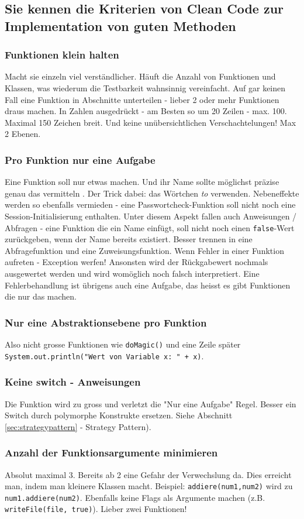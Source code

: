 \subsection{Sie kennen die Kriterien von Clean Code zur Implementation von guten Methoden}
\subsubsection{Funktionen klein halten}
Macht sie einzeln viel verständlicher. Häuft die Anzahl von Funktionen und Klassen, was wiederum die Testbarkeit wahnsinnig vereinfacht. Auf gar keinen Fall eine Funktion in Abschnitte unterteilen - lieber 2 oder mehr Funktionen draus machen.
In Zahlen ausgedrückt - am Besten so um 20 Zeilen - max. 100. Maximal 150 Zeichen breit. Und keine unübersichtlichen Verschachtelungen! Max 2 Ebenen.
\subsubsection{Pro Funktion nur eine Aufgabe}
Eine Funktion soll nur etwas machen.  Und ihr Name sollte möglichst präzise genau das vermitteln . Der Trick dabei: das Wörtchen \emph{to} verwenden.  
Nebeneffekte werden so ebenfalls vermieden - eine Passwortcheck-Funktion soll nicht noch eine Session-Initialisierung enthalten. 
Unter diesem Aspekt fallen auch Anweisungen / Abfragen - eine Funktion die ein Name einfügt, soll nicht noch einen \texttt{false}-Wert zurückgeben, wenn der Name bereits existiert. Besser trennen in eine Abfragefunktion und eine Zuweisungsfunktion. 
Wenn Fehler in einer Funktion aufreten - Exception werfen! Ansonsten wird der Rückgabewert nochmals ausgewertet werden und wird womöglich noch falsch interpretiert.
Eine Fehlerbehandlung ist übrigens auch eine Aufgabe, das heisst es gibt Funktionen die nur das machen.
\subsubsection{Nur eine Abstraktionsebene pro Funktion}
Also nicht grosse Funktionen wie \texttt{doMagic()} und eine Zeile später \texttt{System.out.println("Wert von Variable x: " + x)}.
\subsubsection{Keine switch - Anweisungen}
Die Funktion wird zu gross und verletzt die "Nur eine Aufgabe" Regel. Besser ein Switch durch polymorphe Konstrukte ersetzen. Siehe Abschnitt \ref{sec:strategypattern} - Strategy Pattern).
\subsubsection{Anzahl der Funktionsargumente minimieren}
Absolut maximal 3. Bereits ab 2 eine Gefahr der Verwechslung da. Dies erreicht man, indem man kleinere Klassen macht. Beispiel: \texttt{addiere(num1,num2)} wird zu \texttt{num1.addiere(num2)}. Ebenfalls keine Flags als Argumente machen (z.B. \texttt{writeFile(file, true)}). Lieber zwei Funktionen!
